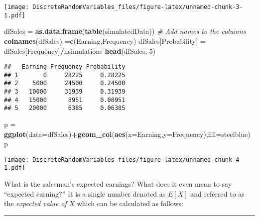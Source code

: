 \documentclass[
]{article}
\newenvironment{Shaded}{\begin{snugshade}}{\end{snugshade}}
\newcommand{\AttributeTok}[1]{\textcolor[rgb]{0.13,0.29,0.53}{#1}}
\newcommand{\CommentTok}[1]{\textcolor[rgb]{0.56,0.35,0.01}{\textit{#1}}}
\newcommand{\DecValTok}[1]{\textcolor[rgb]{0.00,0.00,0.81}{#1}}
\newcommand{\FunctionTok}[1]{\textcolor[rgb]{0.13,0.29,0.53}{\textbf{#1}}}
\newcommand{\NormalTok}[1]{#1}
\newcommand{\OtherTok}[1]{\textcolor[rgb]{0.56,0.35,0.01}{#1}}
\newcommand{\SpecialCharTok}[1]{\textcolor[rgb]{0.81,0.36,0.00}{\textbf{#1}}}
\newcommand{\StringTok}[1]{\textcolor[rgb]{0.31,0.60,0.02}{#1}}
\begin{document}
\texttt{[image: DiscreteRandomVariables\_files/figure-latex/unnamed-chunk-3-1.pdf]}

\begin{Shaded}
\begin{Highlighting}[]
\NormalTok{dfSales }\OtherTok{=} \FunctionTok{as.data.frame}\NormalTok{(}\FunctionTok{table}\NormalTok{(simulatedData))}
\CommentTok{\# Add names to the columns}
\FunctionTok{colnames}\NormalTok{(dfSales) }\OtherTok{=}\FunctionTok{c}\NormalTok{(}\StringTok{\textquotesingle{}Earning\textquotesingle{}}\NormalTok{,}\StringTok{\textquotesingle{}Frequency\textquotesingle{}}\NormalTok{)}
\NormalTok{dfSales[}\StringTok{\textquotesingle{}Probability\textquotesingle{}}\NormalTok{] }\OtherTok{=}\NormalTok{ dfSales[}\StringTok{\textquotesingle{}Frequency\textquotesingle{}}\NormalTok{]}\SpecialCharTok{/}\NormalTok{nsimulations}
\FunctionTok{head}\NormalTok{(dfSales, }\DecValTok{5}\NormalTok{)}
\end{Highlighting}
\end{Shaded}

\begin{verbatim}
##   Earning Frequency Probability
## 1       0     28225     0.28225
## 2    5000     24500     0.24500
## 3   10000     31939     0.31939
## 4   15000      8951     0.08951
## 5   20000      6385     0.06385
\end{verbatim}

\begin{Shaded}
\begin{Highlighting}[]
\NormalTok{p }\OtherTok{=} \FunctionTok{ggplot}\NormalTok{(}\AttributeTok{data=}\NormalTok{dfSales)}\SpecialCharTok{+}\FunctionTok{geom\_col}\NormalTok{(}\FunctionTok{aes}\NormalTok{(}\AttributeTok{x=}\NormalTok{Earning,}\AttributeTok{y=}\NormalTok{Frequency),}\AttributeTok{fill=}\StringTok{\textquotesingle{}steelblue\textquotesingle{}}\NormalTok{)}
\NormalTok{p}
\end{Highlighting}
\end{Shaded}

\texttt{[image: DiscreteRandomVariables\_files/figure-latex/unnamed-chunk-4-1.pdf]}

What is the salesman's expected earnings? What does it even mean to say
``expected earning?'' It is a single number denoted as \(E[X]\) and
referred to as the \emph{expected value of} \(X\) which can be
calculated as follows:

\begin{center}\rule{0.5\linewidth}{0.5pt}\end{center}
\end{document}
